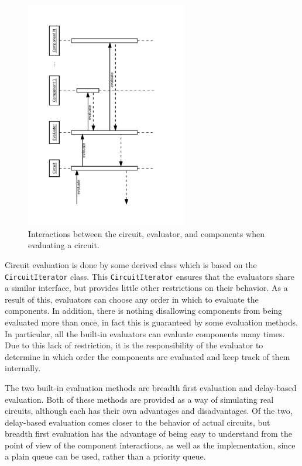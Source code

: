 \documentclass{article}
\newcommand{\ClassName}[1]{\texttt{#1}}
\begin{document}
\begin{figure}[H]
    \begin{center}
        \includegraphics[angle=270,width=200pt]{imgs/CircuitEvaluationInteraction.pdf}
    \end{center}
    \caption{Interactions between the circuit, evaluator, and components when evaluating a circuit.}
\end{figure}

Circuit evaluation is done by some derived class which is based on the \ClassName{CircuitIterator} class. This \ClassName{CircuitIterator} ensures that the evaluators share a similar interface, but provides little other restrictions on their behavior. As a result of this, evaluators can choose any order in which to evaluate the components. In addition, there is nothing disallowing components from being evaluated more than once, in fact this is guaranteed by some evaluation methods. In particular, all the built-in evaluators can evaluate components many times. Due to this lack of restriction, it is the responsibility of the evaluator to determine in which order the components are evaluated and keep track of them internally.

The two built-in evaluation methods are breadth first evaluation and delay-based evaluation. Both of these methods are provided as a way of simulating real circuits, although each has their own advantages and disadvantages. Of the two, delay-based evaluation comes closer to the behavior of actual circuits, but breadth first evaluation has the advantage of being easy to understand from the point of view of the component interactions, as well as the implementation, since a plain queue can be used, rather than a priority queue.
\end{document}
